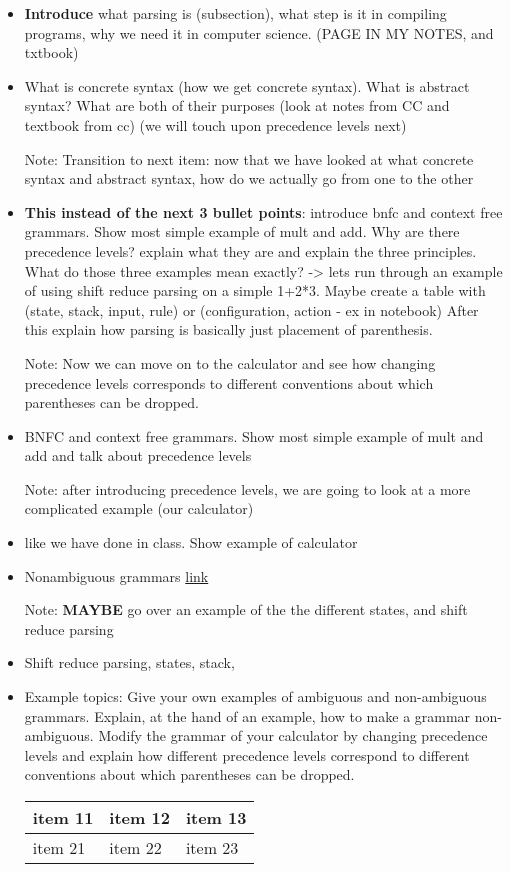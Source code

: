 \documentclass{article}
\begin{document}
\begin{itemize}
    \item \textbf{Introduce} what parsing is (subsection), what step is it in compiling programs, why we need it in computer science. (PAGE IN MY NOTES, and txtbook)
    \item What is concrete syntax (how we get concrete syntax). What is abstract syntax? What are both of their purposes (look at notes from CC and textbook from cc) (we will touch upon precedence levels next)
    \item[Note:] Transition to next item: now that we have looked at what concrete syntax and abstract syntax, how do we actually go from one to the other
    \item \textbf{This instead of the next 3 bullet points}: introduce bnfc and context free grammars. Show most simple example of mult and add. Why are there precedence levels? explain what they are and explain the three principles. What do those three examples mean exactly? -> lets run through an example of using shift reduce parsing on a simple 1+2*3. Maybe create a table with (state, stack, input, rule) or (configuration, action - ex in notebook) After this explain how parsing is basically just placement of parenthesis. 
    \item[Note:] Now we can move on to the calculator and see how changing precedence levels corresponds to different conventions about which parentheses can be dropped.
    
    \item BNFC and context free grammars. Show most simple example of mult and add and talk about precedence levels
    \item[Note:] after introducing precedence levels, we are going to look at a more complicated example (our calculator) 
    \item like we have done in class. Show example of calculator
    \item Nonambiguous grammars \href{https://hackmd.io/@alexhkurz/SJx6T5R48}{link}
    
    
    \item[Note:] \textbf{MAYBE} go over an example of the the different states, and shift reduce parsing
    \item Shift reduce parsing, states, stack, 
    \item Example topics: Give your own examples of ambiguous and non-ambiguous grammars. Explain, at the hand of an example, how to make a grammar non-ambiguous. Modify the grammar of your calculator by changing precedence levels and explain how different precedence levels correspond to different conventions about which parentheses can be dropped.

\begin{tabularx}{0.8\textwidth} { 
  | >{\raggedright\arraybackslash}X 
  | >{\centering\arraybackslash}X 
  | >{\raggedleft\arraybackslash}X | }
 \hline
 item 11 & item 12 & item 13 \\
 \hline
 item 21  & item 22  & item 23  \\
\hline
\end{tabularx}
\end{itemize}
\end{document}
